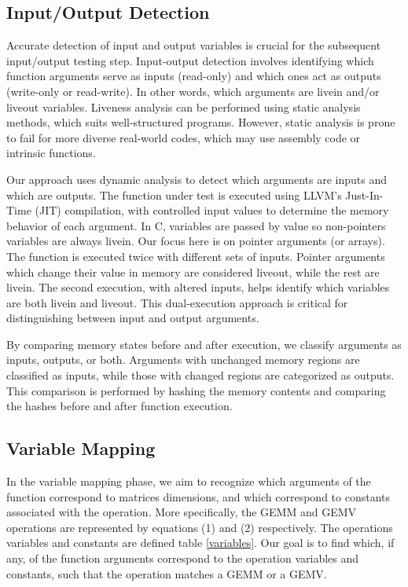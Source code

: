 \documentclass[manuscript,screen,review]{acmart}
\begin{document}
\subsection{Input/Output Detection}
Accurate detection of input and output variables is crucial for the subsequent input/output testing step. Input-output detection involves identifying which function arguments serve as inputs (read-only) and which ones act as outputs (write-only or read-write). In other words, which arguments are livein and/or liveout variables. Liveness analysis can be performed using static analysis methods, which suits well-structured programs. However, static analysis is prone to fail for more diverse real-world codes, which may use assembly code or intrinsic functions.

Our approach uses dynamic analysis to detect which arguments are inputs and which are outputs. The function under test is executed using LLVM's Just-In-Time (JIT) compilation, with controlled input values to determine the memory behavior of each argument. In C, variables are passed by value so non-pointers variables are always livein. Our focus here is on pointer arguments (or arrays). The function is executed twice with different sets of inputs. Pointer arguments which change their value in memory are considered liveout, while the rest are livein. The second execution, with altered inputs, helps identify which variables are both livein and liveout. This dual-execution approach is critical for distinguishing between input and output arguments.

By comparing memory states before and after execution, we classify arguments as inputs, outputs, or both. Arguments with unchanged memory regions are classified as inputs, while those with changed regions are categorized as outputs. This comparison is performed by hashing the memory contents and comparing the hashes before and after function execution.

\subsection{Variable Mapping}

In the variable mapping phase, we aim to recognize which arguments of the function correspond to matrices dimensions, and which correspond to constants associated with the operation. More specifically, the GEMM and GEMV operations are represented by equations (1) and (2) respectively. The operations variables and constants are defined table \ref{variables}. Our goal is to find which, if any, of the function arguments correspond to the operation variables and constants, such that the operation matches a GEMM or a GEMV.
\end{document}
